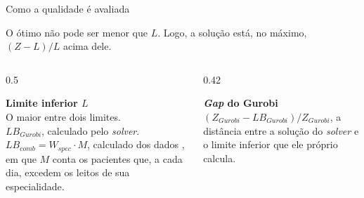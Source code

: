 \documentclass[aspectratio=169,10pt]{beamer}
\newcommand{\framerefs}{}
\newcommand{\slidecites}[1]{\gdef\framerefs{Referências: \cite{#1}}}
\gdef\framerefs{}%
\begin{document}
\begin{frame}{Como a qualidade é avaliada}
    \slidecites{ceschia2011local}
    \centering

    \vspace{0.25cm}
    {\small O ótimo não pode ser menor que $L$. Logo, a solução está, no máximo, $(Z - L)/L$ acima dele.\par}

    \vspace{0.5cm}
    \begin{columns}[t]
        \begin{column}{0.5\textwidth}
            \footnotesize\raggedright
            \textbf{Limite inferior $L$}\\[2pt]
            O maior entre dois limites.\\[2pt]
            $LB_{Gurobi}$, calculado pelo \textit{solver}.\\[2pt]
            $LB_{comb} = W_{spec} \cdot M$, calculado dos dados \cite{ceschia2011local}, em que $M$ conta os pacientes que, a cada dia, excedem os leitos de sua especialidade.
        \end{column}
        \begin{column}{0.42\textwidth}
            \footnotesize\raggedright
            \textbf{\textit{Gap} do Gurobi}\\[2pt]
            $(Z_{Gurobi} - LB_{Gurobi})/Z_{Gurobi}$, a distância entre a solução do \textit{solver} e o limite inferior que ele próprio calcula.
        \end{column}
    \end{columns}
\end{frame}
\end{document}

